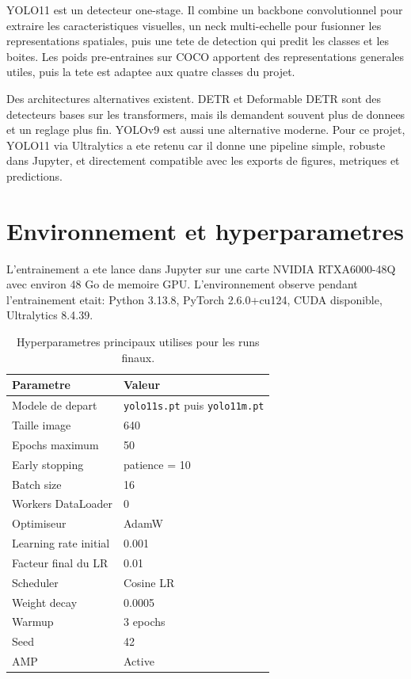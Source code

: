 \documentclass[11pt,a4paper]{article}
\begin{document}
YOLO11 est un detecteur one-stage. Il combine un backbone convolutionnel pour
extraire les caracteristiques visuelles, un neck multi-echelle pour fusionner les
representations spatiales, puis une tete de detection qui predit les classes et les
boites. Les poids pre-entraines sur COCO apportent des representations generales
utiles, puis la tete est adaptee aux quatre classes du projet.

Des architectures alternatives existent. DETR \cite{carion2020detr} et Deformable
DETR \cite{zhu2021deformable} sont des detecteurs bases sur les transformers, mais
ils demandent souvent plus de donnees et un reglage plus fin. YOLOv9
\cite{wang2024yolov9} est aussi une alternative moderne. Pour ce projet, YOLO11 via
Ultralytics a ete retenu car il donne une pipeline simple, robuste dans Jupyter, et
directement compatible avec les exports de figures, metriques et predictions.

\section{Environnement et hyperparametres}
L'entrainement a ete lance dans Jupyter sur une carte NVIDIA RTXA6000-48Q avec
environ 48 Go de memoire GPU. L'environnement observe pendant l'entrainement etait:
Python 3.13.8, PyTorch 2.6.0+cu124, CUDA disponible, Ultralytics 8.4.39.

\begin{table}[H]
\centering
\begin{tabular}{ll}
\toprule
Parametre & Valeur \\
\midrule
Modele de depart & \texttt{yolo11s.pt} puis \texttt{yolo11m.pt} \\
Taille image & 640 \\
Epochs maximum & 50 \\
Early stopping & patience = 10 \\
Batch size & 16 \\
Workers DataLoader & 0 \\
Optimiseur & AdamW \\
Learning rate initial & 0.001 \\
Facteur final du LR & 0.01 \\
Scheduler & Cosine LR \\
Weight decay & 0.0005 \\
Warmup & 3 epochs \\
Seed & 42 \\
AMP & Active \\
\bottomrule
\end{tabular}
\caption{Hyperparametres principaux utilises pour les runs finaux.}
\label{tab:hyperparameters}
\end{table}
\end{document}
